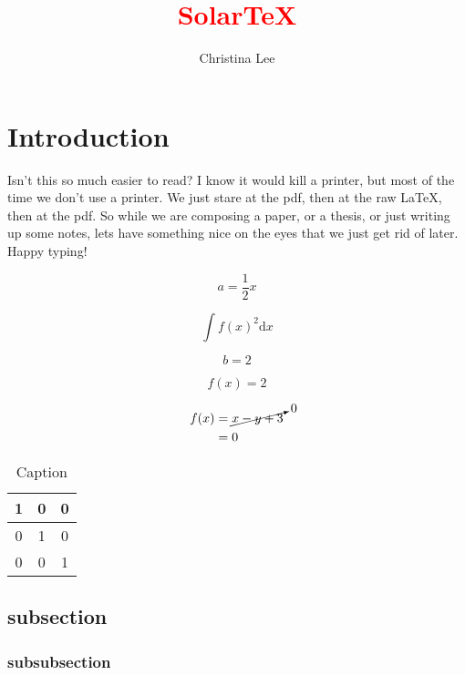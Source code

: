 \documentclass{article}
\title{\textcolor{red}{SolarTeX}}
\author{Christina Lee}
\date{}
\begin{document}
\pagecolor{base03}
\color{base1}



\maketitle


\section{Introduction}
Isn't this so much easier to read? I know it would kill a printer, but most of the time we don't use a printer.  We just stare at the pdf, then at the raw LaTeX, then at the pdf.  So while we are composing a paper, or a thesis, or just writing up some notes, lets have something nice on the eyes that we just get rid of later.  Happy typing!


\begin{equation}
    a=\frac{1}{2} x
\end{equation}

\begin{equation*}
    \int f(x)^2 \mathrm{d}x
\end{equation*}

\[
    b=2
\]


\begin{tcolorbox}
\[
f(x)=2
\]
\end{tcolorbox}

\begin{align}
f(x)&=\cancelto{0}{x-y+3} \nonumber\\
&=0
\end{align}

\begin{table}
    \centering
    \begin{tabular}{c|c | c}
    1     & 0 & 0\\
    \hline
    0     & 1   &   0   \\
    \hline
    0   &   0   &   1
    \end{tabular}
    \caption{Caption}
    \label{tab:my_label}
\end{table}

\subsection{subsection}
\subsubsection{subsubsection}
\end{document}
